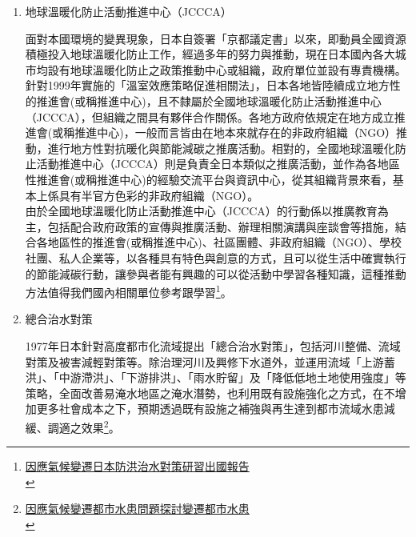\documentclass[a4paper,12pt]{article}
\begin{document}
\begin{enumerate}
\begin{enumerate}
\item 地球溫暖化防止活動推進中心（JCCCA）
\label{sec:orgd1a94ad}

面對本國環境的變異現象，日本自簽署「京都議定書」以來，即動員全國資源積極投入地球溫暖化防止工作，經過多年的努力與推動，現在日本國內各大城市均設有地球溫暖化防止之政策推動中心或組織，政府單位並設有專責機構。\\

針對1999年實施的「溫室效應策略促進相關法」，日本各地皆陸續成立地方性的推進會(或稱推進中心)，且不隸屬於全國地球溫暖化防止活動推進中心（JCCCA），但組織之間具有夥伴合作關係。各地方政府依規定在地方成立推進會(或稱推進中心)，一般而言皆由在地本來就存在的非政府組織（NGO）推動，進行地方性對抗暖化與節能減碳之推廣活動。相對的，全國地球溫暖化防止活動推進中心（JCCCA）則是負責全日本類似之推廣活動，並作為各地區性推進會(或稱推進中心)的經驗交流平台與資訊中心，從其組織背景來看，基本上係具有半官方色彩的非政府組織（NGO）。\\

由於全國地球溫暖化防止活動推進中心（JCCCA）的行動係以推廣教育為主，包括配合政府政策的宣傳與推廣活動、辦理相關演講與座談會等措施，結合各地區性的推進會(或稱推進中心)、社區團體、非政府組織（NGO）、學校社團、私人企業等，以各種具有特色與創意的方式，且可以從生活中確實執行的節能減碳行動，讓參與者能有興趣的可以從活動中學習各種知識，這種推動方法值得我們國內相關單位參考跟學習\footnote{\href{https://www.google.com/url?sa=t\&rct=j\&q=\&esrc=s\&source=web\&cd=\&ved=2ahUKEwib2OL31MLvAhVyF6YKHcy4Cp4QFjABegQIBhAD\&url=https\%3A\%2F\%2Fws.ndc.gov.tw\%2FDownload.ashx\%3Fu\%3DLzAwMS9hZG1pbmlzdHJhdG9yLzEwL3JlbGZpbGUvNTY1OC80MjUxLzgyOTIyN2QzLTA4MDYtNDBjYS04MGMwLTQyMzA3MmZjM2I3ZC5wZGY\%253D\%26n\%3DOTgwNzA15Zug5oeJ5rCj5YCZ6K6K6YG35pel5pys6Ziy5rSq5rK75rC05bCN562WLnBkZg\%253D\%253D\%26icon\%3D..pdf\&usg=AOvVaw2xKxAX\_XQpcGVM6dD17x9d}{因應氣候變遷日本防洪治水對策研習出國報告}\\\label{orgcbf101b}}。\\

\item 總合治水對策
\label{sec:org40ce962}

1977年日本針對高度都市化流域提出「總合治水對策」，包括河川整備、流域對策及被害減輕對策等。除治理河川及興修下水道外，並運用流域「上游蓄洪」、「中游滯洪」、「下游排洪」、「雨水貯留」及「降低低地土地使用強度」等策略，全面改善易淹水地區之淹水潛勢，也利用既有設施強化之方式，在不增加更多社會成本之下，預期透過既有設施之補強與再生達到都市流域水患減緩、調適之效果\footnote{\href{https://www.google.com/url?sa=t\&rct=j\&q=\&esrc=s\&source=web\&cd=\&ved=2ahUKEwiT6crnt7zvAhWhF6YKHZw8BAwQFjABegQIAhAD\&url=https\%3A\%2F\%2Fws.ndc.gov.tw\%2FDownload.ashx\%3Fu\%3DLzAwMS9hZG1pbmlzdHJhdG9yLzEwL3JlbGZpbGUvNTY0NC8zMjcxLzAwNTg5NTNfMS5wZGY\%253D\%26n\%3DMjAxMjA4MjcxNTQ2MjE3Mjc0NTc3LnBkZg\%253D\%253D\%26icon\%3D..pdf\&usg=AOvVaw18hKOrOs--51JlqZQSVdDY}{因應氣候變遷都市水患問題探討變遷都市水患}\\\label{org2df2a26}}。\\


\end{enumerate}
\end{enumerate}
\end{document}
